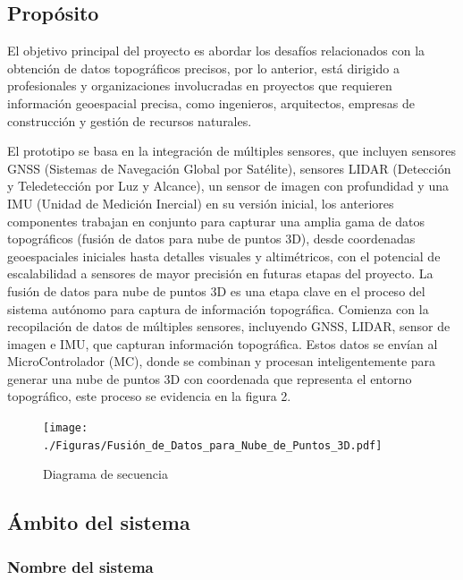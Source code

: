 \documentclass[12pt,a4paper, twoside]{article} %
\begin{document}
\newpage


\subsection{Propósito}
\label{sec:org434c3ef}

El objetivo principal del proyecto es abordar los desafíos relacionados con la obtención de datos topográficos precisos, por lo anterior, está dirigido a profesionales y organizaciones involucradas en proyectos que requieren información geoespacial precisa, como ingenieros, arquitectos, empresas de construcción y gestión de recursos naturales.

El prototipo se basa en la integración de múltiples sensores, que incluyen sensores GNSS (Sistemas de Navegación Global por Satélite), sensores LIDAR (Detección y Teledetección por Luz y Alcance), un sensor de imagen con profundidad y una IMU (Unidad de Medición Inercial) en su versión inicial, los anteriores componentes trabajan en conjunto para capturar una amplia gama de datos topográficos (fusión de datos  para nube de puntos 3D), desde coordenadas geoespaciales iniciales hasta detalles visuales y altimétricos, con el potencial de escalabilidad a sensores de mayor precisión en futuras etapas del proyecto. La fusión de datos para nube de puntos 3D es una etapa clave en el proceso del sistema autónomo para captura de información topográfica. Comienza con la recopilación de datos de múltiples sensores, incluyendo GNSS, LIDAR, sensor de imagen e IMU, que capturan información topográfica. Estos datos se envían al MicroControlador (MC), donde se combinan y procesan inteligentemente para generar una nube de puntos 3D con coordenada que representa el entorno topográfico, este proceso se   evidencia en la figura 2.

\begin{figure}[htpb]
\centering
\texttt{[image: ./Figuras/Fusión\_de\_Datos\_para\_Nube\_de\_Puntos\_3D.pdf]}
\caption{Diagrama de secuencia}
\label{fig:diagBloques}
\end{figure}




\subsection{Ámbito del sistema}
\label{sec:org12e44a1}


\subsubsection{Nombre del sistema}
\label{subsec:org12e44a2}
\end{document}
